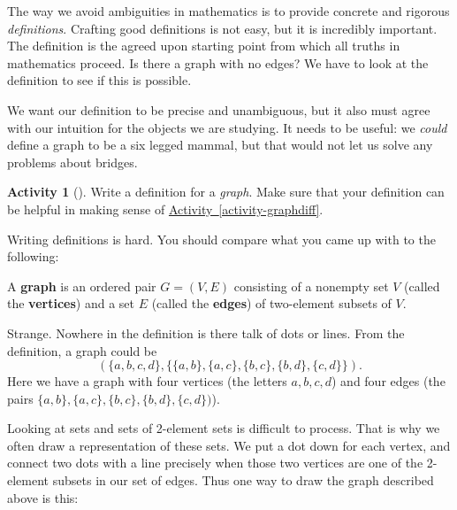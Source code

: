 \documentclass[10pt,]{book}
\newcommand{\terminology}[1]{\textbf{#1}}
\theoremstyle{plain}
\theoremstyle{definition}
\theoremstyle{definition}
\theoremstyle{definition}
\newtheorem{activity}[project]{Activity}
\theoremstyle{definition}
\numberwithin{equation}{chapter}
\newcommand{\vtx}[2]{node[fill,circle,inner sep=0pt, minimum size=4pt,label=#1:#2]{}}
\newcommand{\vr}[1]{\vtx{right}{#1}}
\newcommand{\vl}[1]{\vtx{left}{#1}}
\begin{document}
The way we avoid ambiguities in mathematics is to provide concrete and rigorous \emph{definitions}.  Crafting good definitions is not easy, but it is incredibly important.  The definition is the agreed upon starting point from which all truths in mathematics proceed.  Is there a graph with no edges?  We have to look at the definition to see if this is possible.%
\par
\hypertarget{p-23}{}%
We want our definition to be precise and unambiguous, but it also must agree with our intuition for the objects we are studying.  It needs to be useful: we \emph{could} define a graph to be a six legged mammal, but that would not let us solve any problems about bridges.%
\begin{activity}[]\label{activity-3}
\hypertarget{p-24}{}%
Write a definition for a \emph{graph}.  Make sure that your definition can be helpful in making sense of \hyperref[activity-graphdiff]{Activity~\ref{activity-graphdiff}}.%
\end{activity}
\hypertarget{p-25}{}%
Writing definitions is hard.  You should compare what you came up with to the following:%
\begin{assemblage}\label{assemblage-1}
\hypertarget{p-26}{}%
A \terminology{graph} is an ordered pair \(G = (V, E)\) consisting of a nonempty set \(V\) (called the \terminology{vertices}) and a set \(E\) (called the \terminology{edges}) of two-element subsets of \(V\).%
\end{assemblage}
\hypertarget{p-27}{}%
Strange.  Nowhere in the definition is there talk of dots or lines.  From the definition, a graph could be%
\begin{equation*}
(\{a,b,c,d\}, \{\{a,b\}, \{a,c\}, \{b,c\}, \{b,d\}, \{c,d\}\}).
\end{equation*}
Here we have a graph with four vertices  (the letters \(a, b, c, d\)) and four edges (the pairs \(\{a,b\}, \{a,c\}, \{b,c\}, \{b,d\}, \{c,d\})\)).%
\par
\hypertarget{p-28}{}%
Looking at sets and sets of 2-element sets is difficult to process.  That is why we often draw a representation of these sets.  We put a dot down for each vertex, and connect two dots with a line precisely when those two vertices are one of the 2-element subsets in our set of edges.  Thus one way to draw the graph described above is this:%
\begin{sidebyside}{1}{0.375}{0.375}{0}
\begin{sbspanel}{0.25}
\resizebox{\linewidth}{!}{{
\begin{tikzpicture}[scale=0.7]
   \draw  (-1,1) \vl{\(a\)} -- (1,1) \vr{\(b\)} (-1,1) -- (-1,-1) \vl{\(c\)} -- (1,-1) \vr{\(d\)} -- (1,1) -- (-1,-1);
 \end{tikzpicture}
}
}
\end{sbspanel}
\end{sidebyside}
\end{document}
